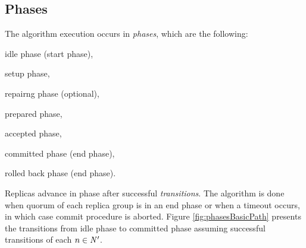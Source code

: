 \subsection{Phases}
The algorithm execution occurs in \emph{phases}, which are the following: 
\begin{enumerate*}[label=\alph*)]
\item idle phase (start phase),
\item setup phase,
\item repairng phase (optional),
\item prepared phase,
\item accepted phase,
\item committed phase (end phase),
\item rolled back phase (end phase).
\end{enumerate*}

Replicas advance in phase after successful \emph{transitions}. The algorithm is done when quorum of each replica group is in an end phase or when a timeout occurs, in which case commit procedure is aborted. Figure \ref{fig:phasesBasicPath} presents the transitions from idle phase to committed phase assuming successful transitions of each $n\in \text{$\mathit{N'}$}$. 



\newcommand{\setupTransition}{$\mathit{setup\_transition()}$\xspace}
\newcommand{\prepareTransition}{$\mathit{prepare\_transition()}$\xspace}
\newcommand{\proposeTransition}{$\mathit{propose\_transition()}$\xspace}
\newcommand{\commitTransition}{$\mathit{commit\_transition()}$\xspace}
\newcommand{\repairingTransition}{$\mathit{reparing\_transition()}$\xspace}



